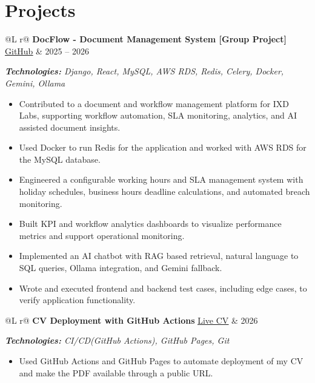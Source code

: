 \documentclass[10pt,a4paper]{article}
\makeatletter
\newcommand{\repolink}[1]{%
    \href{#1}{\underline{GitHub}}
}
\newcommand{\livelink}[1]{%
    \href{#1}{\underline{Live CV}}
}
\newenvironment{cvproject}[4]{%
    \par\noindent
    \begin{tabularx}{\linewidth}{@{}L r@{}}
        \textbf{#1}\quad #2 & #4 \\
    \end{tabularx}\par

    \textit{\textbf{Technologies:} #3}\par
    \nopagebreak

    \begin{itemize}[
        leftmargin=13pt,
        itemsep=0.4pt,
        topsep=0.5pt,
        parsep=0pt,
        partopsep=0pt
    ]
}{%
    \end{itemize}
    \par\vspace{5pt}
}
\makeatother
\begin{document}
\section{Projects}

\begin{cvproject}
    {DocFlow - Document Management System [Group Project]}
    {\repolink{https://github.com/CodeCraft-Software-Project-46/Doc-Flow-Backend}}
    {Django, React, MySQL, AWS RDS, Redis, Celery, Docker, Gemini, Ollama}
    {2025 -- 2026}

    \item Contributed to a document and workflow management platform for
    IXD Labs, supporting workflow automation, SLA monitoring, analytics,
    and AI assisted document insights.

    \item Used Docker to run Redis for the application and worked with
    AWS RDS for the MySQL database.

    \item Engineered a configurable working hours and SLA management system
    with holiday schedules, business hours deadline calculations, and
    automated breach monitoring.

    \item Built KPI and workflow analytics dashboards to visualize
    performance metrics and support operational monitoring.

    \item Implemented an AI chatbot with RAG based retrieval,
    natural language to SQL queries, Ollama integration, and Gemini fallback.

    \item Wrote and executed frontend and backend test cases, including
    edge cases, to verify application functionality.

\end{cvproject}

\begin{cvproject}
    {CV Deployment with GitHub Actions}
    {\livelink{https://savandikodithuwakku.github.io/my-cv/Savandi_Kodithuwakku_CV.pdf}}
    {CI/CD(GitHub Actions), GitHub Pages, Git}
    {2026}

    \item Used GitHub Actions and GitHub Pages to automate deployment of
    my CV and make the PDF available through a public URL.

\end{cvproject}
\end{document}
